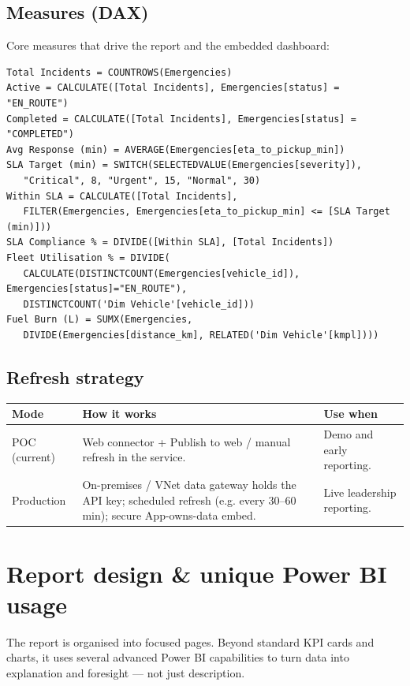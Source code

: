 \documentclass[11pt,a4paper]{article}
\begin{document}
\subsection{Measures (DAX)}
Core measures that drive the report and the embedded dashboard:
\begin{lstlisting}
Total Incidents = COUNTROWS(Emergencies)
Active = CALCULATE([Total Incidents], Emergencies[status] = "EN_ROUTE")
Completed = CALCULATE([Total Incidents], Emergencies[status] = "COMPLETED")
Avg Response (min) = AVERAGE(Emergencies[eta_to_pickup_min])
SLA Target (min) = SWITCH(SELECTEDVALUE(Emergencies[severity]),
   "Critical", 8, "Urgent", 15, "Normal", 30)
Within SLA = CALCULATE([Total Incidents],
   FILTER(Emergencies, Emergencies[eta_to_pickup_min] <= [SLA Target (min)]))
SLA Compliance % = DIVIDE([Within SLA], [Total Incidents])
Fleet Utilisation % = DIVIDE(
   CALCULATE(DISTINCTCOUNT(Emergencies[vehicle_id]), Emergencies[status]="EN_ROUTE"),
   DISTINCTCOUNT('Dim Vehicle'[vehicle_id]))
Fuel Burn (L) = SUMX(Emergencies,
   DIVIDE(Emergencies[distance_km], RELATED('Dim Vehicle'[kmpl])))
\end{lstlisting}

\subsection{Refresh strategy}
\begin{tabularx}{\textwidth}{L{0.16\textwidth} X L{0.20\textwidth}}
\toprule
{}\textbf{Mode} & \textbf{How it works} & \textbf{Use when} \\
\midrule
POC (current) & Web connector + Publish to web / manual refresh in the service. & Demo and early reporting. \\
Production & On-premises / VNet data gateway holds the API key; scheduled refresh (e.g. every 30--60 min); secure App-owns-data embed. & Live leadership reporting. \\
\bottomrule
\end{tabularx}

\section{Report design \& unique Power BI usage}
The report is organised into focused pages. Beyond standard KPI cards and charts, it uses
several advanced Power BI capabilities to turn data into explanation and foresight --- not
just description.
\end{document}
